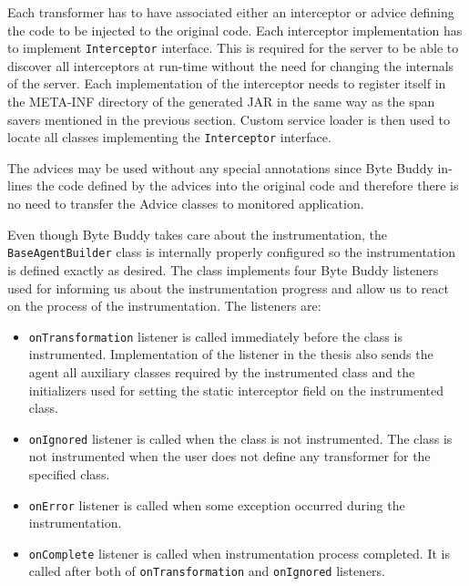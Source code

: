 Each transformer has to have associated either an interceptor or advice defining the code to be injected to the original code. Each interceptor implementation has to implement \texttt{Interceptor} interface. This is required for the server to be able to discover all interceptors at run-time without the need for changing the internals of the server. Each implementation of the interceptor needs to register itself in the META-INF directory of the generated JAR in the same way as the span savers mentioned in the previous section. Custom service loader is then used to locate all classes implementing the \texttt{Interceptor} interface. 

The advices may be used without any special annotations since Byte Buddy in-lines the code defined by the advices into the original code and therefore there is no need to transfer the Advice classes to monitored application.

Even though Byte Buddy takes care about the instrumentation, the \texttt{BaseAgentBuilder} class is internally properly configured so the instrumentation is defined exactly as desired. The class implements four Byte Buddy listeners used for informing us about the instrumentation progress and allow us to react on the process of the instrumentation. The listeners are:
\begin{itemize}
	\item \texttt{onTransformation} listener is called immediately before the class is instrumented.  Implementation of the listener in the thesis also sends the agent all auxiliary classes required by the instrumented class and the initializers used for setting the static interceptor field on the instrumented class.
	\item \texttt{onIgnored} listener is called when the class is not instrumented. The class is not instrumented when the user does not define any transformer for the specified class.
	\item \texttt{onError} listener is called when some exception occurred during the instrumentation.
	\item \texttt{onComplete} listener is called when instrumentation process completed. It is called after both of \texttt{onTransformation} and \texttt{onIgnored} listeners.
\end{itemize}

